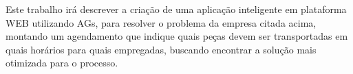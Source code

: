 \par Este trabalho irá descrever a criação de uma aplicação inteligente em
plataforma WEB utilizando AGs, para resolver o problema da empresa citada acima,
montando um agendamento que indique quais peças devem ser transportadas em quais
horários para quais empregadas, buscando encontrar a solução mais otimizada para
o processo.




%